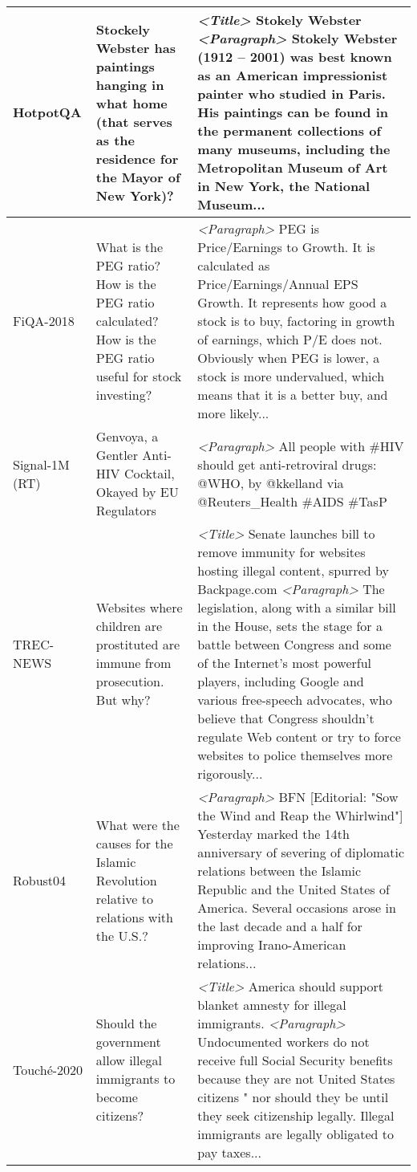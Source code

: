 \documentclass{article}
\begin{document}
\begin{table*}[t!]
{\begin{tabular}{l | l | l }
   HotpotQA      & \multicolumn{1}{p{6cm}|}{Stockely Webster has paintings hanging in what home (that serves as the residence for the Mayor of New York)?}& \multicolumn{1}{p{13cm}}{\textit{<Title>} Stokely Webster \textit{<Paragraph>} Stokely Webster (1912 – 2001) was best known as an American impressionist painter who studied in Paris. His paintings can be found in the permanent collections of many museums, including the Metropolitan Museum of Art in New York, the National Museum...} \\ \midrule
    FiQA-2018    & \multicolumn{1}{p{6cm}|}{What is the PEG ratio? How is the PEG ratio calculated? How is the PEG ratio useful for stock investing?} & \multicolumn{1}{p{13cm}}{\textit{<Paragraph>} PEG is Price/Earnings to Growth.  It is calculated as Price/Earnings/Annual EPS Growth.  It represents how good a stock is to buy, factoring in growth of earnings, which P/E does not.  Obviously when PEG is lower, a stock is more undervalued, which means that it is a better buy, and more likely...} \\ \midrule
   Signal-1M (RT) & \multicolumn{1}{p{6cm}|}{Genvoya, a Gentler Anti-HIV Cocktail, Okayed by EU Regulators} & \multicolumn{1}{p{13cm}}{\textit{<Paragraph>} All people with \#HIV should get anti-retroviral drugs: @WHO, by @kkelland  via @Reuters\_Health \#AIDS \#TasP}\\ \midrule
   TREC-NEWS     & \multicolumn{1}{p{6cm}|}{Websites where children are prostituted are immune from prosecution. But why?} & \multicolumn{1}{p{13cm}}{\textit{<Title>} Senate launches bill to remove immunity for websites hosting illegal content, spurred by Backpage.com \textit{<Paragraph>}  The legislation, along with a similar bill in the House, sets the stage for a battle between Congress and some of the Internet’s most powerful players, including Google and various free-speech advocates, who believe that Congress shouldn’t regulate Web content or try to force websites to police themselves more rigorously...}\\ \midrule
   Robust04 & \multicolumn{1}{p{6cm}|}{What were the causes for the Islamic Revolution relative to relations with the U.S.?} & \multicolumn{1}{p{13cm}}{\textit{<Paragraph>}  BFN [Editorial: "Sow the Wind and Reap the Whirlwind"]  Yesterday marked the 14th anniversary of severing of diplomatic relations between the Islamic Republic and the United States of America. Several occasions arose in the last decade and a half for improving Irano-American relations...} \\ \midrule
   Touch\'e-2020 & \multicolumn{1}{p{6cm}|}{Should the government allow illegal immigrants to become citizens?} & \multicolumn{1}{p{13cm}}{\textit{<Title>} America should support blanket amnesty for illegal immigrants. \textit{<Paragraph>} Undocumented workers do not receive full Social Security benefits because they are not United States citizens " nor should they be until they seek citizenship legally. Illegal immigrants are legally obligated to pay taxes...} \\ \midrule 

\end{tabular}}
\end{table*}
\end{document}
